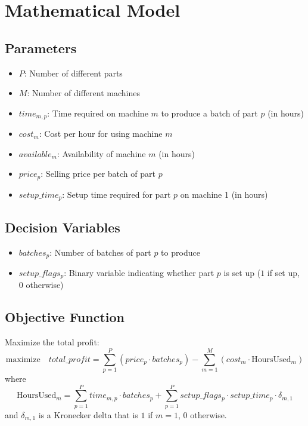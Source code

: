 \documentclass{article}
\begin{document}
\section*{Mathematical Model}

\subsection*{Parameters}
\begin{itemize}
    \item $P$: Number of different parts
    \item $M$: Number of different machines
    \item $time_{m,p}$: Time required on machine $m$ to produce a batch of part $p$ (in hours)
    \item $cost_{m}$: Cost per hour for using machine $m$
    \item $available_{m}$: Availability of machine $m$ (in hours)
    \item $price_{p}$: Selling price per batch of part $p$
    \item $setup\_time_{p}$: Setup time required for part $p$ on machine 1 (in hours)
\end{itemize}

\subsection*{Decision Variables}
\begin{itemize}
    \item $batches_{p}$: Number of batches of part $p$ to produce
    \item $setup\_flags_{p}$: Binary variable indicating whether part $p$ is set up ($1$ if set up, $0$ otherwise)
\end{itemize}

\subsection*{Objective Function}
Maximize the total profit:
\[
\text{maximize} \quad total\_profit = \sum_{p=1}^{P} (price_{p} \cdot batches_{p}) - \sum_{m=1}^{M} (cost_{m} \cdot \text{HoursUsed}_{m})
\]
where
\[
\text{HoursUsed}_{m} = \sum_{p=1}^{P} time_{m,p} \cdot batches_{p} + \sum_{p=1}^{P} setup\_flags_{p} \cdot setup\_time_{p} \cdot \delta_{m,1}
\]
and $\delta_{m,1}$ is a Kronecker delta that is $1$ if $m=1$, $0$ otherwise.
\end{document}

